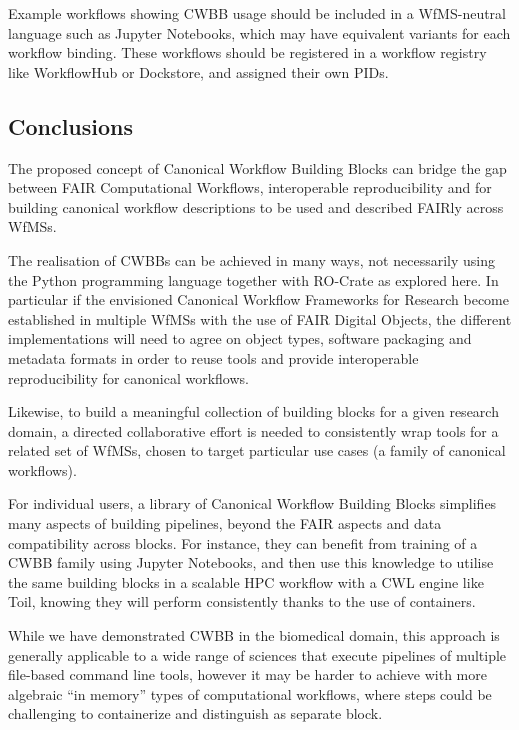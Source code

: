 Example workflows showing CWBB usage should be included in a
WfMS-neutral language such as Jupyter Notebooks, which may have
equivalent variants for each workflow binding. These workflows should be
registered in a workflow registry like WorkflowHub or Dockstore, and
assigned their own PIDs.

\hypertarget{conclusions}{%
\subsection{Conclusions}\label{conclusions}}

The proposed concept of Canonical Workflow Building Blocks can bridge
the gap between FAIR Computational Workflows, interoperable
reproducibility and for building canonical workflow descriptions to be
used and described FAIRly across WfMSs.

The realisation of CWBBs can be achieved in many ways, not necessarily
using the Python programming language together with RO-Crate as explored
here. In particular if the envisioned Canonical Workflow Frameworks for
Research become established in multiple WfMSs with the use of FAIR
Digital Objects, the different implementations will need to agree on
object types, software packaging and metadata formats in order to reuse
tools and provide interoperable reproducibility for canonical workflows.

Likewise, to build a meaningful collection of building blocks for a
given research domain, a directed collaborative effort is needed to
consistently wrap tools for a related set of WfMSs, chosen to target
particular use cases (a family of canonical workflows).

For individual users, a library of Canonical Workflow Building Blocks
simplifies many aspects of building pipelines, beyond the FAIR aspects
and data compatibility across blocks. For instance, they can benefit
from training of a CWBB family using Jupyter Notebooks, and then use
this knowledge to utilise the same building blocks in a scalable HPC
workflow with a CWL engine like Toil, knowing they will perform
consistently thanks to the use of containers.

While we have demonstrated CWBB in the biomedical domain, this approach
is generally applicable to a wide range of sciences that execute
pipelines of multiple file-based command line tools, however it may be
harder to achieve with more algebraic ``in memory'' types of
computational workflows, where steps could be challenging to
containerize and distinguish as separate block.

